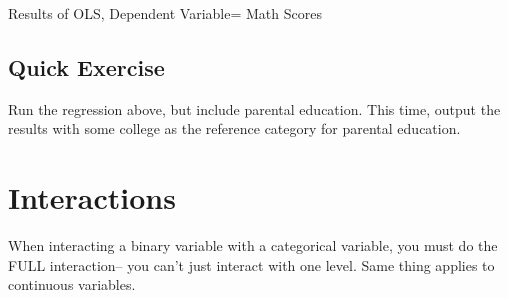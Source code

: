 \documentclass[12 pt]{article}
\begin{document}
\begin{table}
  \centering
  \caption{Results of OLS, Dependent Variable= Math Scores}
  
\end{table}


\subsection{Quick Exercise}
\label{sec:quick-exercise-1}

Run the regression above, but include parental education. This time,
output the results with some college as the reference category for
parental education. 

\section{Interactions}

When interacting a binary variable with a categorical variable, you
must do the FULL interaction-- you can't just interact with one
level. Same thing applies to continuous variables. 
\end{document}
